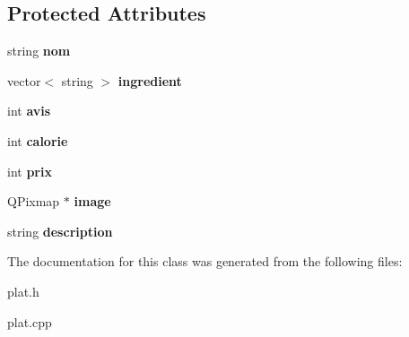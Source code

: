 \subsection*{Protected Attributes}
\begin{DoxyCompactItemize}
\item 
string {\bfseries nom}\hypertarget{classplat_a3c797e85405202eeb72d27e9358bb48c}{}\label{classplat_a3c797e85405202eeb72d27e9358bb48c}

\item 
vector$<$ string $>$ {\bfseries ingredient}\hypertarget{classplat_aae512984318bde2cf4eeee899356d512}{}\label{classplat_aae512984318bde2cf4eeee899356d512}

\item 
int {\bfseries avis}\hypertarget{classplat_a8ff6d91450dda37738ca53b6cb12f5ce}{}\label{classplat_a8ff6d91450dda37738ca53b6cb12f5ce}

\item 
int {\bfseries calorie}\hypertarget{classplat_afc100e872d21ec0b2107649a76890113}{}\label{classplat_afc100e872d21ec0b2107649a76890113}

\item 
int {\bfseries prix}\hypertarget{classplat_aa1a30c5d06b80832f9d9bba4c42e49ae}{}\label{classplat_aa1a30c5d06b80832f9d9bba4c42e49ae}

\item 
Q\+Pixmap $\ast$ {\bfseries image}\hypertarget{classplat_ac9e759af7eec13f84be5da06428de68c}{}\label{classplat_ac9e759af7eec13f84be5da06428de68c}

\item 
string {\bfseries description}\hypertarget{classplat_acb4ed458ba6346de0b46fd3edb988a6b}{}\label{classplat_acb4ed458ba6346de0b46fd3edb988a6b}

\end{DoxyCompactItemize}


The documentation for this class was generated from the following files\+:\begin{DoxyCompactItemize}
\item 
plat.\+h\item 
plat.\+cpp\end{DoxyCompactItemize}
